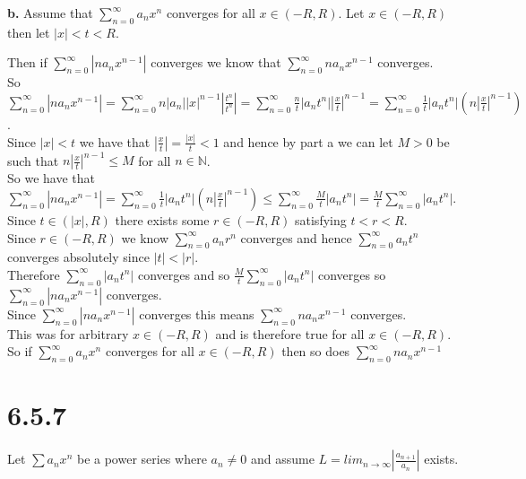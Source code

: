 \documentclass{article}
\begin{document}
{\Large\textbf{b.}} Assume that $\sum _{n=0}^{\infty} a_n x^n$ converges for all $x\in (-R, R)$. Let $x\in (-R, R)$ then let $|x| < t < R$.
\begin{center}
    \doublespacing
    Then if $\sum _{n=0}^{\infty} |n a_n x^{n-1}|$ converges we know that $\sum _{n=0}^{\infty} n a_n x^{n-1}$ converges.
    \\So $\sum _{n=0}^{\infty} |n a_n x^{n-1}| = \sum _{n=0}^{\infty} n |a_n| |x|^{n-1} |\frac{t^n}{t^n}| =\sum _{n=0}^{\infty} \frac{n}{t} |a_n t^n| |\frac{x}{t}|^{n-1} =\sum _{n=0}^{\infty} \frac{1}{t} |a_n t^n| (n|\frac{x}{t}|^{n-1})$.
    \\Since $|x| < t$ we have that $|\frac{x}{t}| =\frac{|x|}{t} < 1$ and hence by part a we can let $M > 0$ be such that $n|\frac{x}{t}|^{n-1}\leq M$ for all $n\in\mathbb{N}$.
    \\So we have that $\sum _{n=0}^{\infty} |n a_n x^{n-1}| =\sum _{n=0}^{\infty} \frac{1}{t} |a_n t^n| (n|\frac{x}{t}|^{n-1})\leq\sum _{n=0}^{\infty} \frac{M}{t} |a_n t^n| =\frac{M}{t}\sum _{n=0}^{\infty} |a_n t^n|$.
    \\Since $t\in (|x|, R)$ there exists some $r\in (-R, R)$ satisfying $t < r < R$.
    \\Since $r\in (-R, R)$ we know $\sum _{n=0}^{\infty} a_n r^n$ converges and hence $\sum _{n=0}^{\infty} a_n t^n$ converges absolutely since $|t| < |r|$.
    \\Therefore $\sum _{n=0}^{\infty} |a_n t^n|$ converges and so $\frac{M}{t}\sum _{n=0}^{\infty} |a_n t^n|$ converges so $\sum _{n=0}^{\infty} |n a_n x^{n-1}|$ converges.
    \\Since $\sum _{n=0}^{\infty} |n a_n x^{n-1}|$ converges this means $\sum _{n=0}^{\infty} n a_n x^{n-1}$ converges.
    \\This was for arbitrary $x\in (-R, R)$ and is therefore true for all $x\in (-R, R)$.
    \\So if $\sum _{n=0}^{\infty} a_n x^n$ converges for all $x\in (-R, R)$ then so does $\sum _{n=0}^{\infty} n a_n x^{n-1}$ \qedsymbol
\end{center}


\newpage
\section*{6.5.7}
\begin{center}
    Let $\sum a_n x^n$ be a power series where $a_n\neq 0$ and assume $L = lim_{n\rightarrow\infty} |\frac{a_{n+1}}{a_n}|$ exists.
\end{center}
\end{document}
